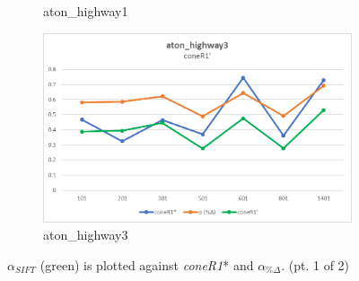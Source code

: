 \begin{appendices}
\begin{figure}
\begin{subfigure}{.45\linewidth}
  \caption{aton\_highway1}
\end{subfigure}
\hfill
\begin{subfigure}{.45\linewidth}
  \includegraphics[width=1\linewidth]{figures/appendix/highway3_prime.jpg}
  \caption{aton\_highway3}
\end{subfigure}
\caption{$\alpha_{SIFT}$ (green) is plotted against \textit{coneR1}* and $\alpha_{\%\Delta}$. (pt. 1 of 2)}

\end{figure}

\begin{figure}


\end{figure}
\end{appendices}
